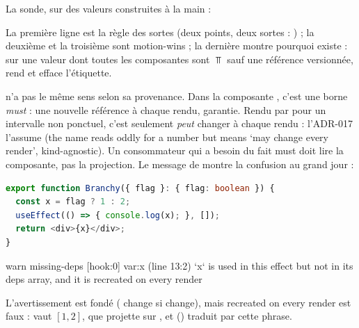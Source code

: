 La sonde, sur des valeurs construites à la main :
La première ligne est la règle des sortes (deux points, deux sortes :
) ; la deuxième et la troisième sont motion-wins ; la dernière
montre pourquoi  existe : sur une valeur dont
toutes les composantes sont $\Top$ sauf une référence versionnée,
 rend  et efface l'étiquette.

\begin{piege}
   n'a pas le même sens selon sa provenance. Dans la
  composante , c'est une borne \emph{must} : une nouvelle
  référence à chaque rendu, garantie. Rendu par  pour un
  intervalle non ponctuel, c'est seulement \og \emph{peut} changer à chaque
  rendu\fg{} : l'ADR-017 l'assume (\og the name reads oddly for a number but
  means `may change every render', kind-agnostic\fg{}). Un consommateur qui
  a besoin du fait must doit lire la composante, pas la projection. Le
  message de  montre la confusion au grand jour :
\begin{lstlisting}[language=TypeScript,caption={Un nombre à deux valeurs (\file{/tmp/ch10/limits.tsx}, extrait)},label={lst:statevalue-stabilite-branchy}]
export function Branchy({ flag }: { flag: boolean }) {
  const x = flag ? 1 : 2;
  useEffect(() => { console.log(x); }, []);
  return <div>{x}</div>;
}
\end{lstlisting}
\begin{sortie}
    warn   missing-deps  [hook:0]  var:x  (line 13:2)  `x` is used in this effect but not in its deps array, and it is recreated on every render
\end{sortie}
  L'avertissement est fondé ( change si  change), mais
  \og recreated on every render\fg{} est faux :  vaut $[1,2]$, que
   projette sur , et
   () traduit
   par cette phrase.
\end{piege}

